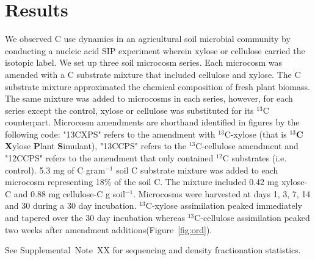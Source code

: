 \section{Results}
We observed C use dynamics in an agricultural soil microbial community by
conducting a nucleic acid SIP experiment wherein xylose or cellulose carried
the isotopic label. We set up three soil microcosm series. Each microcosm was
amended with a C substrate mixture that included cellulose and xylose. The
C substrate mixture approximated the chemical composition of fresh
plant biomass. The same mixture was added to microcosms in each series,
however, for each series except the control, xylose or cellulose was
substituted for its $^{13}$C counterpart. Microcosm amendments are shorthand
identified in figures by the following code: "13CXPS" refers to
the amendment with $^{13}$C-xylose (that is $^{13}$\textbf{C} \textbf{X}ylose
\textbf{P}lant \textbf{S}imulant), "13CCPS" refers to the $^{13}$C-cellulose
amendment and "12CCPS" refers to the amendment that only contained $^{12}$C
substrates (i.e. control). 5.3 mg of C gram$^{-1}$ soil C substrate mixture was
added to each microcosm representing 18\% of the soil C. The mixture included
0.42 mg xylose-C and 0.88 mg cellulose-C g soil$^{-1}$. Microcosms were
harvested at days 1, 3, 7, 14 and 30 during a 30 day
incubation. $^{13}$C-xylose assimilation peaked immediately and tapered over
the 30 day incubation whereas $^{13}$C-cellulose assimilation peaked two weeks
after amendment additions(Figure~\ref{fig:ord}). 

See Supplemental~Note~XX for sequencing and density fractionation statistics.


